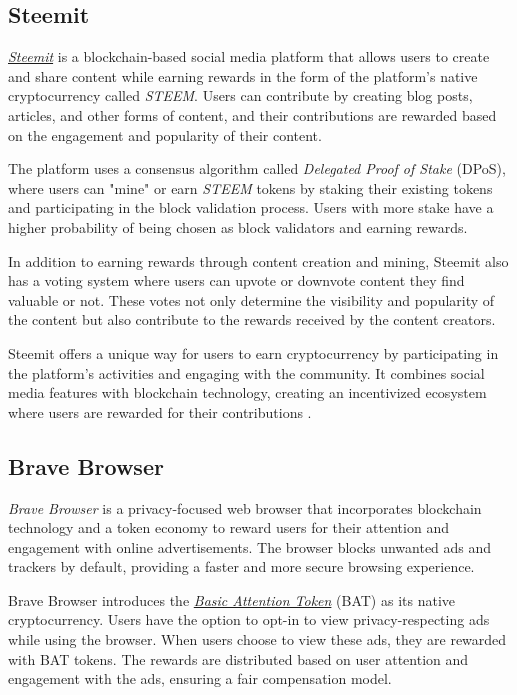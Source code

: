 \subsection{Steemit}

\href{https://steemit.com}{\textit{Steemit}} is a blockchain-based social media platform that allows users to create and share content while earning rewards in the form of the platform's native cryptocurrency called \textit{STEEM}. Users can contribute by creating blog posts, articles, and other forms of content, and their contributions are rewarded based on the engagement and popularity of their content.\newline

The platform uses a consensus algorithm called \textit{Delegated Proof of Stake} (DPoS), where users can "mine" or earn \textit{STEEM} tokens by staking their existing tokens and participating in the block validation process. Users with more stake have a higher probability of being chosen as block validators and earning rewards.\newline

In addition to earning rewards through content creation and mining, Steemit also has a voting system where users can upvote or downvote content they find valuable or not. These votes not only determine the visibility and popularity of the content but also contribute to the rewards received by the content creators.\newline

Steemit offers a unique way for users to earn cryptocurrency by participating in the platform's activities and engaging with the community. It combines social media features with blockchain technology, creating an incentivized ecosystem where users are rewarded for their contributions \cite{steemit}.\newline

\subsection{Brave Browser}

\textit{Brave Browser} is a privacy-focused web browser that incorporates blockchain technology and a token economy to reward users for their attention and engagement with online advertisements. The browser blocks unwanted ads and trackers by default, providing a faster and more secure browsing experience.\newline

Brave Browser introduces the \href{https://brave.com/brave-rewards/}{\textit{Basic Attention Token}} (BAT) as its native cryptocurrency. Users have the option to opt-in to view privacy-respecting ads while using the browser. When users choose to view these ads, they are rewarded with BAT tokens. The rewards are distributed based on user attention and engagement with the ads, ensuring a fair compensation model.\newline

